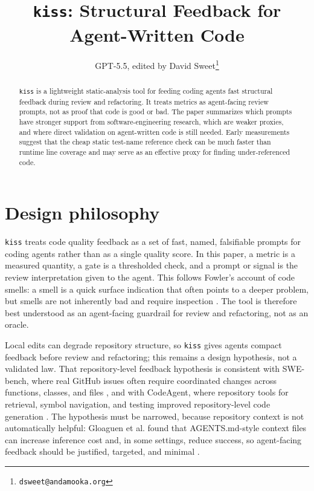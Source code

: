 \documentclass[11pt]{article}
\title{\texttt{kiss}: Structural Feedback for Agent-Written Code}
\author{GPT-5.5, edited by David Sweet\thanks{\texttt{dsweet@andamooka.org}}}
\date{}
\begin{document}
\maketitle

\begin{abstract}
\texttt{kiss} is a lightweight static-analysis tool for feeding coding agents
fast structural feedback during review and refactoring.  It treats metrics as
agent-facing review prompts, not as proof that code is good or bad.  The paper
summarizes which prompts have stronger support from software-engineering
research, which are weaker proxies, and where direct validation on agent-written
code is still needed.  Early measurements suggest that the cheap static
test-name reference check can be much faster than runtime line coverage and may
serve as an effective proxy for finding under-referenced code.
\end{abstract}

\section{Design philosophy}

\texttt{kiss} treats code quality feedback as a set of fast, named, falsifiable
prompts for coding agents rather than as a single quality score.  In this paper,
a metric is a measured quantity, a gate is a thresholded check, and a prompt or
signal is the review interpretation given to the agent.  This follows
Fowler's account of
code smells: a smell is a quick surface indication that often points to a deeper
problem, but smells are not inherently bad and require inspection
\cite{fowler-code-smell}.  The tool is therefore best understood as an
agent-facing guardrail for review and refactoring, not as an oracle.

Local edits can degrade repository structure, so \texttt{kiss} gives agents
compact feedback before review and refactoring; this remains a design
hypothesis, not a validated law.  That repository-level feedback hypothesis is
consistent with SWE-bench, where real GitHub issues often require coordinated
changes across functions, classes, and files \cite{jimenez-swebench}, and with
CodeAgent, where repository tools for retrieval, symbol navigation, and testing
improved repository-level code generation \cite{zhang-codeagent}.  The hypothesis
must be narrowed, because repository context is not automatically helpful:
Gloaguen et al. found that AGENTS.md-style context files can increase inference
cost and, in some settings, reduce success, so agent-facing feedback should be
justified, targeted, and minimal
\cite{gloaguen-agents}.
\end{document}
